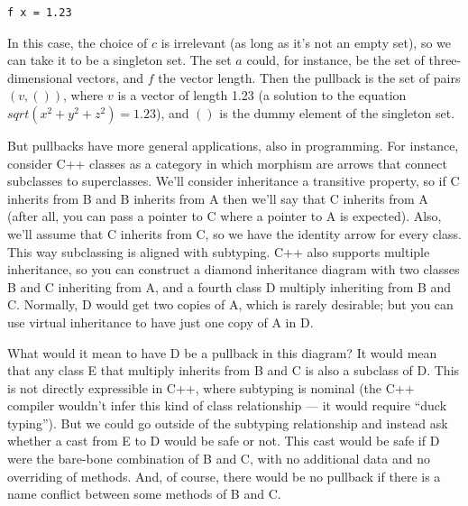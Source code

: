 \begin{Verbatim}
f x = 1.23
\end{Verbatim}

In this case, the choice of $c$ is irrelevant (as long as it's
not an empty set), so we can take it to be a singleton set. The set
$a$ could, for instance, be the set of three-dimensional vectors,
and $f$ the vector length. Then the pullback is the set of pairs
$(v, ())$, where $v$ is a vector of length 1.23 (a
solution to the equation $sqrt(x^{2}+y^{2}+z^{2}) = 1.23$), and
$()$ is the dummy element of the singleton set.

But pullbacks have more general applications, also in programming. For
instance, consider C++ classes as a category in which morphism are
arrows that connect subclasses to superclasses. We'll consider
inheritance a transitive property, so if C inherits from B and B
inherits from A then we'll say that C inherits from A (after all, you
can pass a pointer to C where a pointer to A is expected). Also, we'll
assume that C inherits from C, so we have the identity arrow for every
class. This way subclassing is aligned with subtyping. C++ also supports
multiple inheritance, so you can construct a diamond inheritance diagram
with two classes B and C inheriting from A, and a fourth class D
multiply inheriting from B and C. Normally, D would get two copies of A,
which is rarely desirable; but you can use virtual inheritance to have
just one copy of A in D.

What would it mean to have D be a pullback in this diagram? It would
mean that any class E that multiply inherits from B and C is also a
subclass of D. This is not directly expressible in C++, where subtyping
is nominal (the C++ compiler wouldn't infer this kind of class
relationship --- it would require ``duck typing''). But we could go
outside of the subtyping relationship and instead ask whether a cast
from E to D would be safe or not. This cast would be safe if D were the
bare-bone combination of B and C, with no additional data and no
overriding of methods. And, of course, there would be no pullback if
there is a name conflict between some methods of B and C.

\begin{figure}[H]
\centering
{}
\end{figure}

